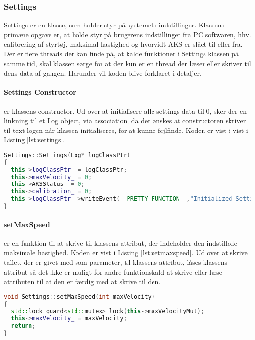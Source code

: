 \subsubsection{Settings} \label{sec:settings_impl}

Settings er en klasse, som holder styr på systemets indstillinger. Klassens primære opgave er, at holde styr på brugerens indstillinger fra PC softwaren, hhv. calibrering af styrtøj, maksimal hastighed og hvorvidt AKS er slået til eller fra.
Der er flere threads der kan finde på, at kalde funktioner i Settings klassen på samme tid, skal klassen sørge for at der kun er en thread der læser eller skriver til dens data af gangen.
Herunder vil koden blive forklaret i detaljer.


\paragraph{Settings Constructor} er klassens constructor. Ud over at initialisere alle settings data til 0, sker der en linkning til et Log object, via association, da det ønskes at constructoren skriver til text logen når klassen initialiseres, for at kunne fejlfinde. Koden er vist i vist i Listing \ref{lst:settings}.

\begin{lstlisting}[caption={Settings Constructor},label=lst:settings, language=c++]
Settings::Settings(Log* logClassPtr)
{
  this->logClassPtr_ = logClassPtr;
  this->maxVelocity_ = 0;
  this->AKSStatus_ = 0;
  this->calibration_ = 0;
  this->logClassPtr_->writeEvent(__PRETTY_FUNCTION__,"Initialized Settings")
}
\end{lstlisting}


\paragraph{setMaxSpeed} er en funktion til at skrive til klassens attribut, der indeholder den indstillede maksimale hastighed. Koden er vist i Listing \ref{lst:setmaxspeed}. Ud over at skrive tallet, der er givet med som parameter, til klassens attribut, låses klassens attribut så det ikke er muligt for andre funktionskald at skrive eller læse attributen til at den er færdig med at skrive til den. 

\begin{lstlisting}[caption={Funktionen setMaxSpeed},label=lst:setmaxspeed, language=c++]
void Settings::setMaxSpeed(int maxVelocity)
{
  std::lock_guard<std::mutex> lock(this->maxVelocityMut);
  this->maxVelocity_ = maxVelocity;
  return;
}
\end{lstlisting}



